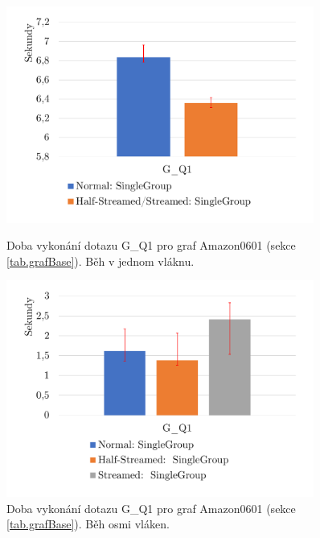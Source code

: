 \begin{figure}[!htp]
    \centering
    \begin{minipage}{0.45\textwidth}
        \centering
        \includegraphics[width=0.9\textwidth]{../img/amazonGroupByQ1ST.pdf} %
        \caption{Doba vykonání dotazu G\_Q1 pro graf Amazon0601 (sekce \ref{tab.grafBase}). Běh v jednom vláknu.}
        \label{figure.amazonGQ1ST}
    \end{minipage}\hfill
    \begin{minipage}{0.45\textwidth}
        \centering
        \includegraphics[width=0.9\textwidth]{../img/amazonGroupByQ1Par.pdf} %
        \caption{Doba vykonání dotazu G\_Q1 pro graf Amazon0601 (sekce \ref{tab.grafBase}). Běh osmi vláken.}
        \label{figure.amazonGQ1Par}
    \end{minipage}
\end{figure}

